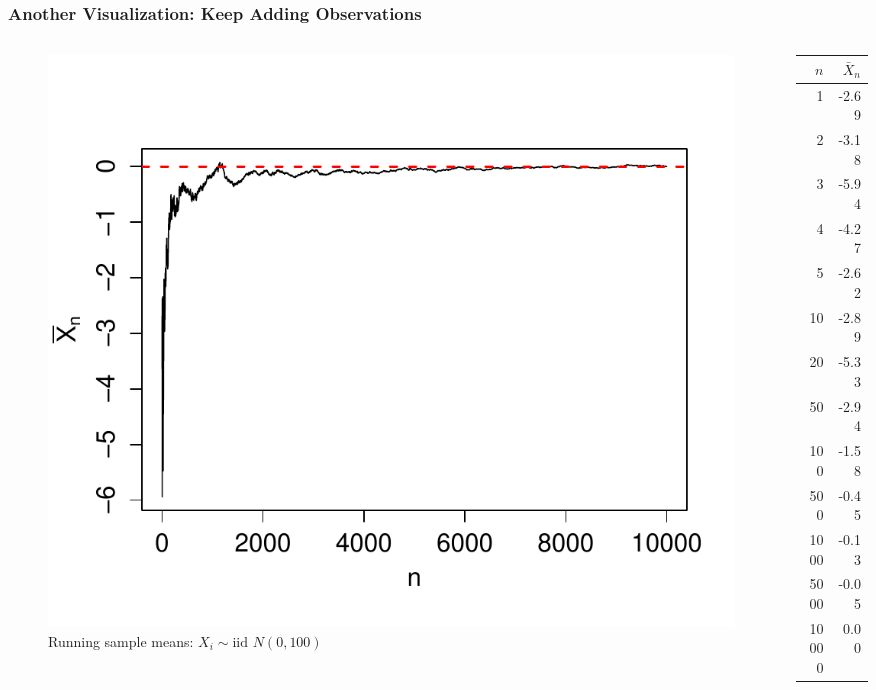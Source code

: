\documentclass[handout]{beamer}
\begin{document}


\begin{frame}
\frametitle{Another Visualization: Keep Adding Observations}
\begin{columns} 
\begin{column}[c]{8cm} 
\begin{figure}
\centering
\includegraphics[scale = 0.5]{./images/WLLN}
\caption{Running sample means: $X_i \sim \mbox{iid } N(0, 100)$}
\end{figure}
\end{column} 
\begin{column}[c]{3cm} 

\footnotesize
\begin{table}
\begin{tabular}{|rr|}
\hline
$n$&$\bar{X}_n$\\
\hline
1 &-2.69\\
2 &-3.18\\
3 &-5.94\\
4 &-4.27\\
5 &-2.62\\
10& -2.89\\
20& -5.33\\
50 &-2.94\\
100& -1.58\\
500 &-0.45\\
1000& -0.13\\
5000& -0.05\\
10000&  0.00\\
\hline
\end{tabular}
\end{table}

\end{column} 
\end{columns} 


\end{frame}
%
%
%
\end{document}
